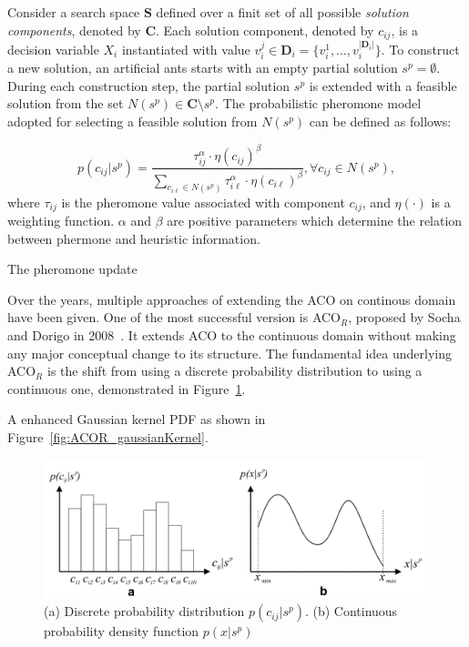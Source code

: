 Consider a search space $\boldsymbol{S}$ defined over a finit set of all possible \textit{solution components}, denoted by $\boldsymbol{C}$.
Each solution component, denoted by $c_{ij}$, is a decision variable $X_i$ instantiated with value $v^{j}_{i} \in \boldsymbol{D}_i = \{ v^{1}_{i}, ..., v^{|\boldsymbol{D}_i|}_{i}\}$.
To construct a new solution, an artificial ants starts with an empty partial solution $s^{p} = \emptyset$.
During each construction step, the partial solution $s^{p}$ is extended with a feasible solution from the set $N(s^{p}) \in \boldsymbol{C} \setminus s^{p}$.
The probabilistic pheromone model adopted for selecting a feasible solution from $N(s^{p})$ can be defined as follows:

\begin{equation}
p(c_{ij}|s^p) = \frac{\tau^{\alpha}_{ij} \cdot \eta(c_{ij})^{\beta}} 
                     {\sum_{c_{i\ell}\in N(s^{p})} \tau^{\alpha}_{i\ell} \cdot \eta(c_{i\ell})^{\beta} },  \forall c_{ij} \in N(s^{p}),
\end{equation}
where $\tau_{ij}$ is the pheromone value associated with component $c_{ij}$, and $\eta(\cdot)$ is a weighting function. 
$\alpha$ and $\beta$ are positive parameters which determine the relation between phermone and heuristic information.

The pheromone update


Over the years, multiple approaches of extending the ACO on continous domain have been given.
One of the most successful version is ACO$_{R}$, proposed by Socha and Dorigo in 2008~\cite{Socha:2008:ACOR}.
It extends ACO to the continuous domain without making any major conceptual change to its structure.
The fundamental idea underlying ACO$_{R}$ is the shift from using a discrete probability distribution to using a continuous one, demonstrated in Figure~\ref{fig:ACOR_distribution}. 

A enhanced Gaussian kernel PDF as shown in Figure~\ref{fig:ACOR_gaussianKernel}.

\begin{figure}
\centering
\includegraphics[width=\textwidth]{ACOR_distribution}
\caption{(a) Discrete probability distribution $p(c_{ij}|s^{p})$. (b) Continuous probability density function $p(x|s^{p})$}\label{fig:ACOR_distribution}
\end{figure}

